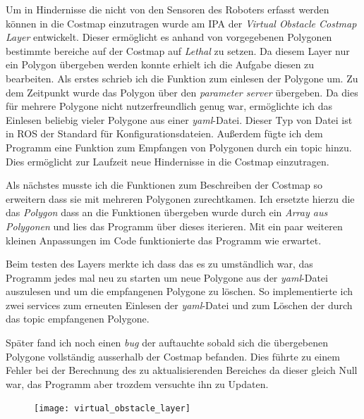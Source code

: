 Um in Hindernisse die nicht von den Sensoren des Roboters erfasst werden können in die Costmap einzutragen wurde am IPA der \emph{Virtual Obstacle Costmap Layer} entwickelt. Dieser ermöglicht es anhand von vorgegebenen Polygonen bestimmte bereiche auf der Costmap auf \emph{Lethal} zu setzen. 
Da diesem Layer nur ein Polygon übergeben werden konnte erhielt ich die Aufgabe diesen zu bearbeiten.
Als erstes schrieb ich die Funktion zum einlesen der Polygone um. Zu dem Zeitpunkt wurde das Polygon über den \emph{parameter server} übergeben. Da dies für mehrere Polygone nicht nutzerfreundlich genug war, ermöglichte ich das Einlesen beliebig vieler Polygone aus einer \emph{yaml}-Datei. Dieser Typ von Datei ist in ROS der Standard für Konfigurationsdateien.
Außerdem fügte ich dem Programm eine Funktion zum Empfangen von Polygonen durch ein \Gls{topic} hinzu. Dies ermöglicht zur Laufzeit neue Hindernisse in die Costmap einzutragen.

Als nächstes musste ich die Funktionen zum Beschreiben der Costmap so erweitern dass sie mit mehreren Polygonen zurechtkamen. Ich ersetzte hierzu die das \emph{Polygon} dass an die Funktionen übergeben wurde durch ein \emph{Array aus Polygonen} und lies das Programm über dieses iterieren. Mit ein paar weiteren kleinen Anpassungen im Code funktionierte das Programm wie erwartet. 

Beim testen des Layers merkte ich dass das es zu umständlich war, das Programm jedes mal neu zu starten um neue Polygone aus der \emph{yaml}-Datei auszulesen und um die empfangenen Polygone zu löschen.
So implementierte ich zwei \Glspl{service} zum erneuten Einlesen der \emph{yaml}-Datei und zum Löschen der durch das \Gls{topic} empfangenen Polygone.

Später fand ich noch einen \emph{bug} der auftauchte sobald sich die übergebenen Polygone vollständig ausserhalb der Costmap befanden. Dies führte zu einem Fehler bei der Berechnung des zu aktualisierenden Bereiches da dieser gleich Null war, das Programm aber trozdem versuchte ihn zu Updaten.

\begin{figure}[ht]
\begin{center}
\texttt{[image: virtual\_obstacle\_layer]}
  \label{costmap_values}
\end{center}
\end{figure}
